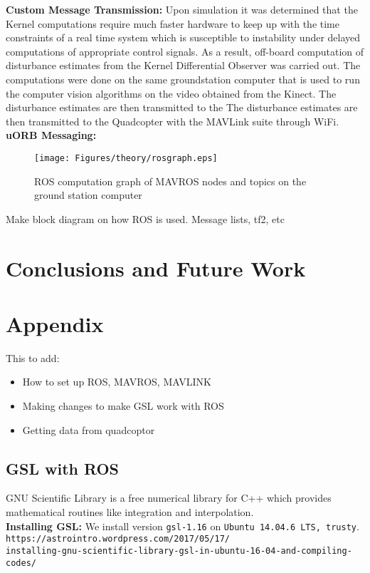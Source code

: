 \documentclass{article}
\begin{document}
\textbf{Custom Message Transmission:} Upon simulation it was determined that the Kernel computations require much faster hardware to keep up with the time constraints of a real time system which is susceptible to instability under delayed computations of appropriate control signals. As a result, off-board computation of disturbance estimates from the Kernel Differential Observer was carried out. The computations were done on the same groundstation computer that is used to run the computer vision algorithms on the video obtained from the Kinect. The disturbance estimates are then transmitted to the The disturbance estimates are then transmitted to the Quadcopter with the MAVLink suite through WiFi.\\
\textbf{uORB Messaging:} \\

\begin{figure}[H]
\centering
\centerline{\texttt{[image: Figures/theory/rosgraph.eps]}}
\caption{ROS computation graph of MAVROS nodes and topics on the ground station computer}
\label{rosgraph}
\end{figure}

Make block diagram on how ROS is used. Message lists, tf2, etc 

\section{Conclusions and Future Work}

\section{Appendix}
This to add: 
\begin{itemize}
	\item How to set up ROS, MAVROS, MAVLINK
	\item Making changes to make GSL work with ROS
	\item Getting data from quadcoptor 
\end{itemize}

\subsection{GSL with ROS}
GNU Scientific Library is a free numerical library for C++ which provides mathematical routines like integration and interpolation. 
\\\textbf{Installing GSL:} We install version \texttt{gsl-1.16} on \texttt{Ubuntu 14.04.6 LTS, trusty}.
\texttt{https://astrointro.wordpress.com/2017/05/17/ \\ installing-gnu-scientific-library-gsl-in-ubuntu-16-04-and-compiling-codes/}
\end{document}
